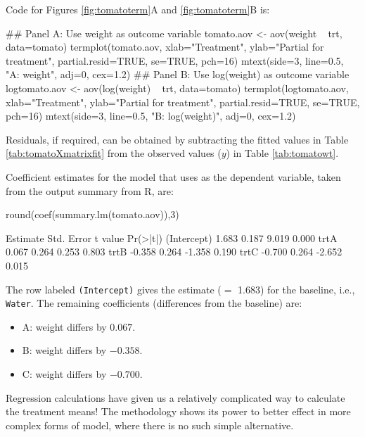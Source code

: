 \noindent
Code for Figures \ref{fig:tomatoterm}A and \ref{fig:tomatoterm}B is:
\begin{Schunk}
\begin{Sinput}
## Panel A: Use weight as outcome variable
tomato.aov <- aov(weight ~ trt, data=tomato)
termplot(tomato.aov, xlab="Treatment",
         ylab="Partial for treatment",
         partial.resid=TRUE, se=TRUE, pch=16)
mtext(side=3, line=0.5, "A: weight", adj=0, cex=1.2)
## Panel B: Use log(weight) as outcome variable
logtomato.aov <- aov(log(weight) ~ trt, data=tomato)
termplot(logtomato.aov, xlab="Treatment",
         ylab="Partial for treatment",
         partial.resid=TRUE, se=TRUE, pch=16)
mtext(side=3, line=0.5, "B: log(weight)", adj=0,
      cex=1.2)
\end{Sinput}
\end{Schunk}

Residuals, if required, can be obtained by subtracting the
fitted values in Table \ref{tab:tomatoXmatrixfit} from the observed
values ($y$) in Table \ref{tab:tomatowt}.

Coefficient estimates for the model that uses  as the
dependent variable, taken from the output summary from R, are:

\begin{Schunk}
\begin{Sinput}
round(coef(summary.lm(tomato.aov)),3)
\end{Sinput}
\begin{Soutput}
            Estimate Std. Error t value Pr(>|t|)
(Intercept)    1.683      0.187   9.019    0.000
trtA           0.067      0.264   0.253    0.803
trtB          -0.358      0.264  -1.358    0.190
trtC          -0.700      0.264  -2.652    0.015
\end{Soutput}
\end{Schunk}

The row labeled \verb!(Intercept)! gives the estimate ($=$ 1.683) for
the baseline, i.e., \verb!Water!.  The remaining coefficients
(differences from the baseline) are:\vspace*{-2pt}
\begin{itemize}
\leftskip-1.3pt
\item[ ]A: weight differs by $0.067$.
\item[ ]B: weight differs by $-0.358$.
\item[ ]C: weight differs by $-0.700$.
\vspace*{-2pt}
\end{itemize}%
Regression calculations have given
us a relatively complicated way to calculate the treatment means!
The methodology shows its power to better effect in more complex
forms of model, where there is no such simple alternative.

